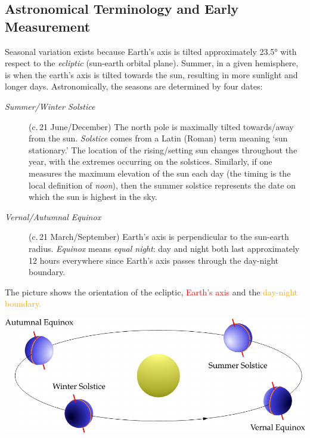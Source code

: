 \goodbreak



\subsection{Astronomical Terminology and Early Measurement}\label{ssec:astro1}

Seasonal variation exists because Earth's axis is tilted approximately \ang{23.5} with respect to the \emph{ecliptic} (sun-earth orbital plane). Summer, in a given hemisphere, is when the earth's axis is tilted towards the sun, resulting in more sunlight and longer days. Astronomically, the seasons are determined by four dates:
\begin{description}
	\item[\normalfont\emph{Summer/Winter Solstice}] (c.\,21\st{} June/December) The north pole is maximally tilted towards/away from the sun. \emph{Solstice} comes from a Latin (Roman) term meaning `sun stationary.' The location of the rising/setting sun changes throughout the year, with the extremes occurring on the solstices. Similarly, if one measures the maximum elevation of the sun each day (the timing is the local definition of \emph{noon}), then the summer solstice represents the date on which the sun is highest in the sky.
	\item[\normalfont\emph{Vernal/Autumnal Equinox}] (c.\,21\st{} March/September) Earth's axis is perpendicular to the sun-earth radius. \emph{Equinox} means \emph{equal night}: day and night both last approximately 12 hours everywhere since Earth's axis passes through the day-night boundary.
\end{description}
The picture shows the orientation of the ecliptic, \textcolor{red}{Earth's axis} and the \textcolor{orange}{day-night boundary.}

\begin{center}
	\href{http://www.math.uci.edu/~ndonalds/math184/ecliptic.html}{\includegraphics[scale=0.95]{ecliptic}}
\end{center}

